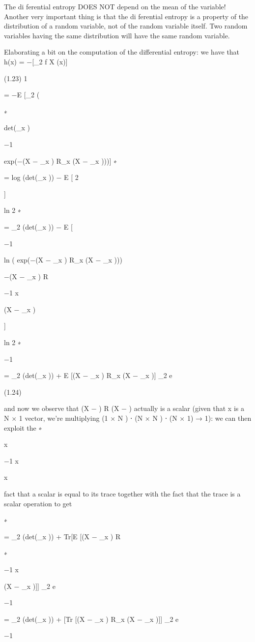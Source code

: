 The di ferential entropy DOES NOT depend on the mean of the variable!
Another very important thing is that the di ferential entropy is a property of the distribution of a random variable, not of the random variable itself.
Two random variables having the same distribution will have the same random variable.

Elaborating a bit on the computation of the differential entropy: we have that h(x) = −[\log_2 f X (x)]

(1.23)
1

= −E [\log_2 (

∗

det(\piR_x )

−1

exp(−(X − \mu_x ) R_x (X − \mu_x )))]
∗

= log (det(\piR_x )) − E [
2

]

ln 2
∗

= \log_2 (det(\piR_x )) − E [

−1

ln ( exp(−(X − \mu_x ) R_x (X − \mu_x )))

−(X − \mu_x ) R

−1 x

(X − \mu_x )

]

ln 2
∗

−1

= \log_2 (det(\piR_x )) + E [(X − \mu_x ) R_x (X − \mu_x )] \log_2 e

(1.24)

and now we observe that (X − \mu ) R (X − \mu ) actually is a scalar (given that x is a N × 1 vector, we're multiplying (1 × N ) ⋅ (N × N ) ⋅ (N × 1) → 1): we can then exploit the
∗

x

−1 x

x

fact that a scalar is equal to its trace together with the fact that the trace is a scalar operation to get

∗

= \log_2 (det(\piR_x )) + Tr[E [(X − \mu_x ) R

∗

−1 x

(X − \mu_x )]] \log_2 e

−1

= \log_2 (det(\piR_x )) + [Tr [(X − \mu_x ) R_x (X − \mu_x )]] \log_2 e

−1

